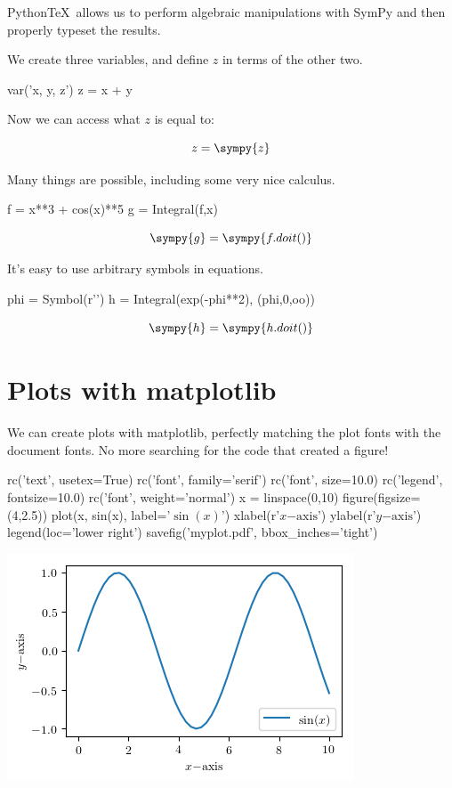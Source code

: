 \documentclass[11pt]{article}
\newcommand{\pytex}{Python\TeX}
\begin{document}
\pytex\ allows us to perform algebraic manipulations with SymPy and then properly typeset the results.

We create three variables, and define $z$ in terms of the other two.

\begin{sympyblock}
var('x, y, z')
z = x + y
\end{sympyblock}

Now we can access what $z$ is equal to:

\[z=\sympy{z}\]

Many things are possible, including some very nice calculus.

\begin{sympyblock}
f = x**3 + cos(x)**5
g = Integral(f,x)
\end{sympyblock}

\[\sympy{g}=\sympy{f.doit()}\]

It's easy to use arbitrary symbols in equations.

\begin{sympyblock}
phi = Symbol(r'\phi')
h = Integral(exp(-phi**2), (phi,0,oo))
\end{sympyblock}

\[\sympy{h}=\sympy{h.doit()}\]



\section{Plots with matplotlib}

We can create plots with matplotlib, perfectly matching the plot fonts with the document fonts.  No more searching for the code that created a figure!

\begin{pylabblock}
rc('text', usetex=True)
rc('font', family='serif')
rc('font', size=10.0)
rc('legend', fontsize=10.0)
rc('font', weight='normal')
x = linspace(0,10)
figure(figsize=(4,2.5))
plot(x, sin(x), label='$\sin(x)$')
xlabel(r'$x\mathrm{-axis}$')
ylabel(r'$y\mathrm{-axis}$')
legend(loc='lower right')
savefig('myplot.pdf', bbox_inches='tight')
\end{pylabblock}

\begin{center}
\includegraphics{myplot}
\end{center}
\end{document}
